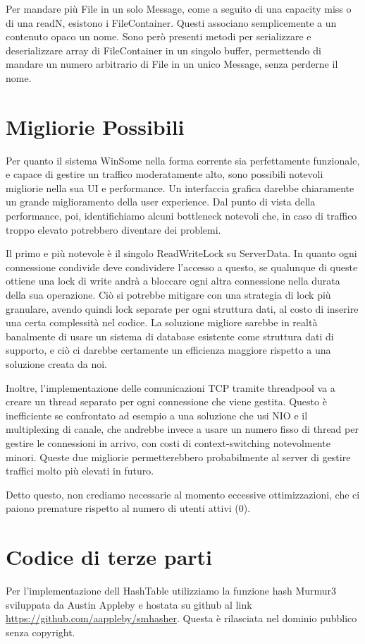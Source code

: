 \documentclass[11pt]{article}
\begin{document}
\begin{flushleft}
Per mandare più File in un solo Message, come a seguito di una capacity miss o di una readN, esistono i FileContainer. Questi associano semplicemente a un contenuto opaco un nome. Sono però presenti metodi per serializzare e deserializzare array di FileContainer in un singolo buffer, permettendo di mandare un numero arbitrario di File in un unico Message, senza perderne il nome.

\section{Migliorie Possibili}

Per quanto il sistema WinSome nella forma corrente sia perfettamente funzionale, e capace di gestire un traffico moderatamente alto, sono possibili notevoli migliorie nella sua UI e performance.
Un interfaccia grafica darebbe chiaramente un grande miglioramento della user experience.
Dal punto di vista della performance, poi, identifichiamo alcuni bottleneck notevoli che, in caso di traffico troppo elevato potrebbero diventare dei problemi.

Il primo e più notevole è il singolo ReadWriteLock su ServerData. In quanto ogni connessione condivide deve condividere l'accesso a questo, se qualunque di queste ottiene una lock di write andrà a bloccare ogni altra connessione nella durata della sua operazione. Ciò si potrebbe mitigare con una strategia di lock più granulare, avendo quindi lock separate per ogni struttura dati, al costo di inserire una certa complessità nel codice. La soluzione migliore sarebbe in realtà banalmente di usare un sistema di database esistente come struttura dati di supporto, e ciò ci darebbe certamente un efficienza maggiore rispetto a una soluzione creata da noi.

Inoltre, l'implementazione delle comunicazioni TCP tramite threadpool va a creare un thread separato per ogni connessione che viene gestita. Questo è inefficiente se confrontato ad esempio a una soluzione che usi NIO e il multiplexing di canale, che andrebbe invece a usare un numero fisso di thread per gestire le connessioni in arrivo, con costi di context-switching notevolmente minori.
Queste due migliorie permetterebbero probabilmente al server di gestire traffici molto più elevati in futuro.

Detto questo, non crediamo necessarie al momento eccessive ottimizzazioni, che ci paiono premature rispetto al numero di utenti attivi (0).

\section{Codice di terze parti}
Per l'implementazione dell HashTable utilizziamo la funzione hash Murmur3 sviluppata da Austin Appleby e hostata su github al link \url{https://github.com/aappleby/smhasher}. Questa è rilasciata nel dominio pubblico senza copyright.


\end{flushleft}
\end{document}
